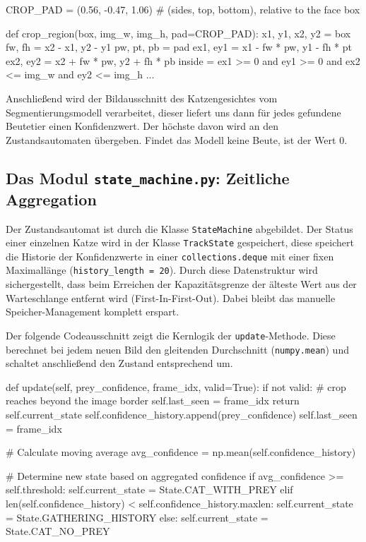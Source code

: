 \begin{PythonCode}[caption={Asymmetrische Randerweiterung für den Bildausschnitt}]
CROP_PAD = (0.56, -0.47, 1.06)  # (sides, top, bottom), relative to the face box

def crop_region(box, img_w, img_h, pad=CROP_PAD):
    x1, y1, x2, y2 = box
    fw, fh = x2 - x1, y2 - y1
    pw, pt, pb = pad
    ex1, ey1 = x1 - fw * pw, y1 - fh * pt
    ex2, ey2 = x2 + fw * pw, y2 + fh * pb
    inside = ex1 >= 0 and ey1 >= 0 and ex2 <= img_w and ey2 <= img_h
    ...
\end{PythonCode}
Anschließend wird der Bildausschnitt des Katzengesichtes vom Segmentierungsmodell verarbeitet, dieser liefert uns dann für jedes gefundene Beutetier einen Konfidenzwert. Der höchste davon wird an den Zustandsautomaten übergeben. Findet das Modell keine Beute, ist der Wert 0.

\subsection{Das Modul \texttt{state\_machine.py}: Zeitliche Aggregation}
\label{sec:impl_sm}
Der Zustandsautomat ist durch die Klasse \texttt{StateMachine} abgebildet. Der Status einer einzelnen Katze wird in der Klasse \texttt{TrackState} gespeichert, diese speichert die Historie der Konfidenzwerte in einer \texttt{collections.deque} mit einer fixen Maximallänge (\texttt{history\_length = 20}). Durch diese Datenstruktur wird sichergestellt, dass beim Erreichen der Kapazitätsgrenze der älteste Wert aus der Warteschlange entfernt wird  (\glqq First-In-First-Out\grqq). Dabei bleibt das manuelle Speicher-Management komplett erspart.

Der folgende Codeausschnitt zeigt die Kernlogik der \texttt{update}-Methode. Diese berechnet bei jedem neuen Bild den gleitenden Durchschnitt (\texttt{numpy.mean}) und schaltet anschließend den Zustand entsprechend um.

\begin{PythonCode}[caption={Zustandsermittlung mittels gleitendem Durchschnitt}]
def update(self, prey_confidence, frame_idx, valid=True):
    if not valid:  # crop reaches beyond the image border
        self.last_seen = frame_idx
        return self.current_state
    self.confidence_history.append(prey_confidence)
    self.last_seen = frame_idx

    # Calculate moving average
    avg_confidence = np.mean(self.confidence_history)

    # Determine new state based on aggregated confidence
    if avg_confidence >= self.threshold:
        self.current_state = State.CAT_WITH_PREY
    elif len(self.confidence_history) < self.confidence_history.maxlen:
        self.current_state = State.GATHERING_HISTORY
    else:
        self.current_state = State.CAT_NO_PREY
\end{PythonCode}


